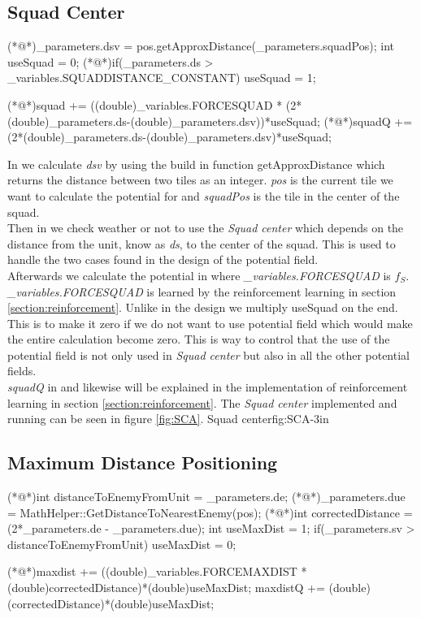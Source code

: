 	\subsection{Squad Center}	
		\begin{Sourcecode}[caption=Squad center]
(*@\lnote@*)_parameters.dsv = pos.getApproxDistance(_parameters.squadPos);	
int useSquad = 0;
(*@\lnote@*)if(_parameters.ds > _variables.SQUADDISTANCE_CONSTANT)
	useSquad = 1;

(*@\lnote@*)squad += ((double)_variables.FORCESQUAD * (2*(double)_parameters.ds-(double)_parameters.dsv))*useSquad;
(*@\lnote@*)squadQ += (2*(double)_parameters.ds-(double)_parameters.dsv)*useSquad;
\end{Sourcecode}
		In  we calculate \textit{dsv} by using the build in function getApproxDistance which returns the distance between two tiles as an integer. \textit{pos} is the current tile we want to calculate the potential for and \textit{squadPos} is the tile in the center of the squad. \\
		
		Then in  we check weather or not to use the \textit{Squad center} which depends on the distance from the unit, know as \textit{ds}, to the center of the squad. This is used to handle the two cases found in the design of the potential field. \\
		
		Afterwards we calculate the potential in  where \textit{\_variables.FORCESQUAD} is $f_{S}$. \textit{\_variables.FORCESQUAD} is learned by the reinforcement learning in section \ref{section:reinforcement}. 
		Unlike in the design we multiply useSquad on the end. This is to make it zero if we do not want to use potential field which would make the entire calculation become zero. This is way to control that the use of the potential field is not only used in \textit{Squad center} but also in all the other potential fields. \\
		
		\textit{squadQ} in  and likewise will be explained in the implementation of reinforcement learning in section \ref{section:reinforcement}. The \textit{Squad center} implemented and running can be seen in figure \ref{fig:SCA}.
			{Squad center}{fig:SCA}{-3in}
			
	\subsection{Maximum Distance Positioning}
		\begin{Sourcecode}[caption=Maximum distance]
(*@\lnote@*)int distanceToEnemyFromUnit = _parameters.de;
(*@\lnote@*)_parameters.due = MathHelper::GetDistanceToNearestEnemy(pos);
(*@\lnote@*)int correctedDistance = (2*_parameters.de - _parameters.due);
int useMaxDist = 1;
if(_parameters.sv > distanceToEnemyFromUnit)
	useMaxDist = 0;

(*@\lnote@*)maxdist += ((double)_variables.FORCEMAXDIST * (double)correctedDistance)*(double)useMaxDist;
maxdistQ += (double)(correctedDistance)*(double)useMaxDist;
\end{Sourcecode}
	
